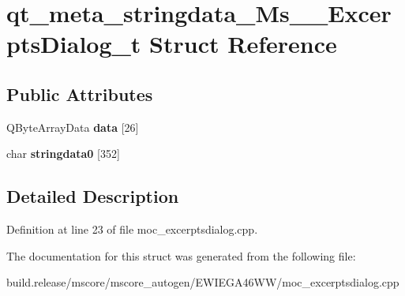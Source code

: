 \hypertarget{structqt__meta__stringdata___ms_____excerpts_dialog__t}{}\section{qt\+\_\+meta\+\_\+stringdata\+\_\+\+Ms\+\_\+\+\_\+\+Excerpts\+Dialog\+\_\+t Struct Reference}
\label{structqt__meta__stringdata___ms_____excerpts_dialog__t}
\subsection*{Public Attributes}
\begin{DoxyCompactItemize}
\item 
\mbox{\label{structqt__meta__stringdata___ms_____excerpts_dialog__t_a71984ab18427943372cbc380e77acc9c}} 
Q\+Byte\+Array\+Data {\bfseries data} \mbox{[}26\mbox{]}
\item 
\mbox{\label{structqt__meta__stringdata___ms_____excerpts_dialog__t_af715b1034cda64319e21d6aec46a26bf}} 
char {\bfseries stringdata0} \mbox{[}352\mbox{]}
\end{DoxyCompactItemize}


\subsection{Detailed Description}


Definition at line 23 of file moc\+\_\+excerptsdialog.\+cpp.



The documentation for this struct was generated from the following file\+:\begin{DoxyCompactItemize}
\item 
build.\+release/mscore/mscore\+\_\+autogen/\+E\+W\+I\+E\+G\+A46\+W\+W/moc\+\_\+excerptsdialog.\+cpp\end{DoxyCompactItemize}
